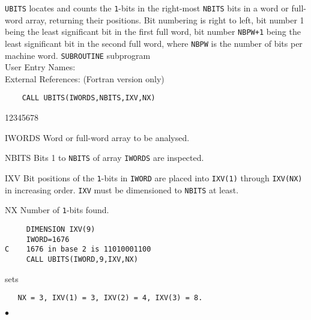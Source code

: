               
           
\Submitter{}                           
      
{\tt UBITS} locates and counts the {\tt 1}-bits in the right-most
{\tt NBITS} bits in a word or full-word array, returning their
positions. Bit numbering is right to left, bit number 1 being the least
significant bit in the first full word, bit number {\tt NBPW+1} being
the least significant bit in the second full word, where {\tt NBPW}
is the number of bits per machine word.
\Structure
{\tt SUBROUTINE} subprogram\\
User Entry Names:  \\
External References:  
(Fortran version only) \\
\Usage
\begin{verbatim}
    CALL UBITS(IWORDS,NBITS,IXV,NX)
\end{verbatim}
\begin{DLtt}{12345678}
\item [IWORDS]  Word or full-word array to be analysed.
\item [NBITS] Bits 1 to {\tt NBITS} of array {\tt IWORDS} are inspected.
\item [IXV] Bit positions of the {\tt 1}-bits in {\tt IWORD} are placed
into {\tt IXV(1)} through {\tt IXV(NX)} in increasing order. {\tt IXV}
must be dimensioned to {\tt NBITS} at least.
\item [NX] Number of {\tt 1}-bits found.
\end{DLtt}
\Examples
\begin{verbatim}
     DIMENSION IXV(9)
     IWORD=1676
C    1676 in base 2 is 11010001100
     CALL UBITS(IWORD,9,IXV,NX)
\end{verbatim}
sets
\begin{verbatim}
   NX = 3, IXV(1) = 3, IXV(2) = 4, IXV(3) = 8.
\end{verbatim}
$\bullet$
